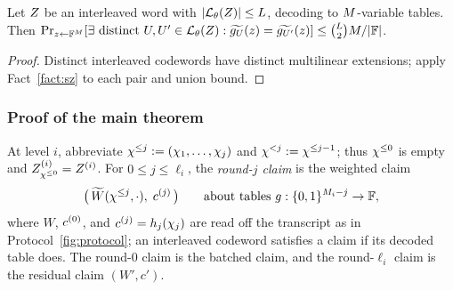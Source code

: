 \begin{lemma}\label{lem:ood}
Let $Z$ be an interleaved word with $|\mathcal{L}_\theta(Z)| \le L$, decoding to $M$-variable tables. Then $\Pr_{z \leftarrow \mathbb{F}^{M}}[\exists \text{ distinct } U, U' \in \mathcal{L}_\theta(Z) : \widetilde{g_U}(z) = \widetilde{g_{U'}}(z)] \le \binom{L}{2} M / |\mathbb{F}|$.
\end{lemma}

\begin{proof}
Distinct interleaved codewords have distinct multilinear extensions; apply Fact~\ref{fact:sz} to each pair and union bound.
\end{proof}

\subsubsection{Proof of the main theorem}\label{pcs:proof}

At level $i$, abbreviate $\chi^{\le j} := (\chi_1, \dots, \chi_j)$ and $\chi^{<j} := \chi^{\le j-1}$; thus $\chi^{\le 0}$ is empty and $Z^{(i)}_{\chi^{\le 0}} = Z^{(i)}$. For $0 \le j \le \ell_i$, the \emph{round-$j$ claim} is the weighted claim
\[
\bigl(\, \widetilde{W}(\chi^{\le j}, \cdot),\; c^{(j)} \,\bigr) \qquad \text{about tables } g : \{0,1\}^{M_i - j} \to \mathbb{F},
\]
where $W$, $c^{(0)}$, and $c^{(j)} = h_j(\chi_j)$ are read off the transcript as in Protocol~\ref{fig:protocol}; an interleaved codeword satisfies a claim if its decoded table does. The round-$0$ claim is the batched claim, and the round-$\ell_i$ claim is the residual claim $(W', c')$.

